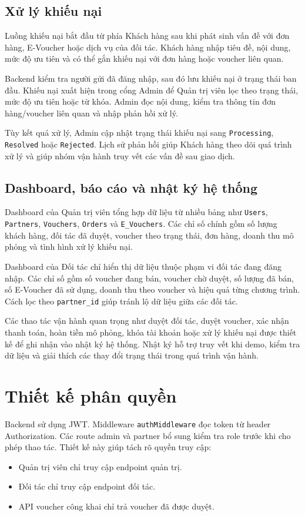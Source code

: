 \subsection{Xử lý khiếu nại}

Luồng khiếu nại bắt đầu từ phía Khách hàng sau khi phát sinh vấn đề với đơn hàng, E-Voucher hoặc dịch vụ của đối tác. Khách hàng nhập tiêu đề, nội dung, mức độ ưu tiên và có thể gắn khiếu nại với đơn hàng hoặc voucher liên quan.

Backend kiểm tra người gửi đã đăng nhập, sau đó lưu khiếu nại ở trạng thái ban đầu. Khiếu nại xuất hiện trong cổng Admin để Quản trị viên lọc theo trạng thái, mức độ ưu tiên hoặc từ khóa. Admin đọc nội dung, kiểm tra thông tin đơn hàng/voucher liên quan và nhập phản hồi xử lý.

Tùy kết quả xử lý, Admin cập nhật trạng thái khiếu nại sang \texttt{Processing}, \texttt{Resolved} hoặc \texttt{Rejected}. Lịch sử phản hồi giúp Khách hàng theo dõi quá trình xử lý và giúp nhóm vận hành truy vết các vấn đề sau giao dịch.

\subsection{Dashboard, báo cáo và nhật ký hệ thống}

Dashboard của Quản trị viên tổng hợp dữ liệu từ nhiều bảng như \texttt{Users}, \texttt{Partners}, \texttt{Vouchers}, \texttt{Orders} và \texttt{E\_Vouchers}. Các chỉ số chính gồm số lượng khách hàng, đối tác đã duyệt, voucher theo trạng thái, đơn hàng, doanh thu mô phỏng và tình hình xử lý khiếu nại.

Dashboard của Đối tác chỉ hiển thị dữ liệu thuộc phạm vi đối tác đang đăng nhập. Các chỉ số gồm số voucher đang bán, voucher chờ duyệt, số lượng đã bán, số E-Voucher đã sử dụng, doanh thu theo voucher và hiệu quả từng chương trình. Cách lọc theo \texttt{partner\_id} giúp tránh lộ dữ liệu giữa các đối tác.

Các thao tác vận hành quan trọng như duyệt đối tác, duyệt voucher, xác nhận thanh toán, hoàn tiền mô phỏng, khóa tài khoản hoặc xử lý khiếu nại được thiết kế để ghi nhận vào nhật ký hệ thống. Nhật ký hỗ trợ truy vết khi demo, kiểm tra dữ liệu và giải thích các thay đổi trạng thái trong quá trình vận hành.

\section{Thiết kế phân quyền}

Backend sử dụng JWT. Middleware \texttt{authMiddleware} đọc token từ header Authorization. Các route admin và partner bổ sung kiểm tra role trước khi cho phép thao tác. Thiết kế này giúp tách rõ quyền truy cập:

\begin{itemize}[leftmargin=1.2cm]
    \item Quản trị viên chỉ truy cập endpoint quản trị.
    \item Đối tác chỉ truy cập endpoint đối tác.
    \item API voucher công khai chỉ trả voucher đã được duyệt.
\end{itemize}


